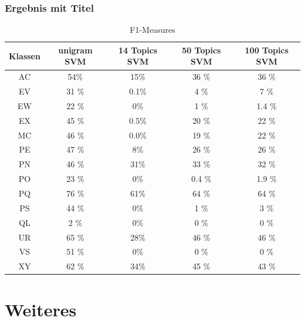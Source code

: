 \documentclass[12pt, xcolor=table]{beamer}
\begin{document}
\begin{frame}
    \frametitle{Ergebnis mit Titel}
    \begin{center}
    \begin{table}
    \begin{tabular}{c|cccc}
        \tiny\textbf{Klassen} &\tiny \textbf{unigram SVM} &\tiny \textbf{14 Topics SVM} & \tiny \textbf{50 Topics SVM} & \tiny \textbf{100 Topics SVM}\\
        \hline
        \tiny AC &\tiny 54\% &\tiny 15\% &\tiny 36 \% &\tiny 36 \%\\
        \tiny EV &\tiny 31 \% &\tiny 0.1\% &\tiny 4 \% &\tiny 7 \%\\
        \tiny EW &\tiny 22 \% &\tiny 0\% &\tiny 1 \% &\tiny 1.4 \%\\
        \tiny EX &\tiny 45 \% &\tiny 0.5\% &\tiny 20 \% &\tiny 22 \%\\
        \tiny MC &\tiny 46 \% &\tiny 0.0\% &\tiny 19 \% &\tiny 22 \%\\
        \tiny PE &\tiny 47 \% &\tiny 8\% &\tiny 26 \% &\tiny 26 \%\\
        \tiny PN &\tiny 46 \% &\tiny 31\% &\tiny 33 \% &\tiny 32 \%\\
        \tiny PO &\tiny 23 \% &\tiny 0\% &\tiny 0.4 \% &\tiny 1.9 \%\\
        \tiny PQ &\tiny 76 \% &\tiny 61\% &\tiny 64 \% &\tiny 64 \%\\
        \tiny PS &\tiny 44 \% &\tiny 0\% &\tiny 1 \% &\tiny 3 \%\\
        \tiny QL &\tiny 2 \% &\tiny 0\% &\tiny 0 \% &\tiny 0 \%\\
        \tiny UR &\tiny 65 \% &\tiny 28\% &\tiny 46 \% &\tiny 46 \%\\
        \tiny VS &\tiny 51 \% &\tiny 0\% &\tiny 0 \% &\tiny 0 \%\\
        \tiny XY &\tiny 62 \% &\tiny 34\% &\tiny 45 \% &\tiny 43 \%\\
    \end{tabular}
     \caption*{F1-Measures}
    \end{table}
    \end{center}
\end{frame}



\section{Weiteres} %
\label{sec:Weiteres}
\end{document}
